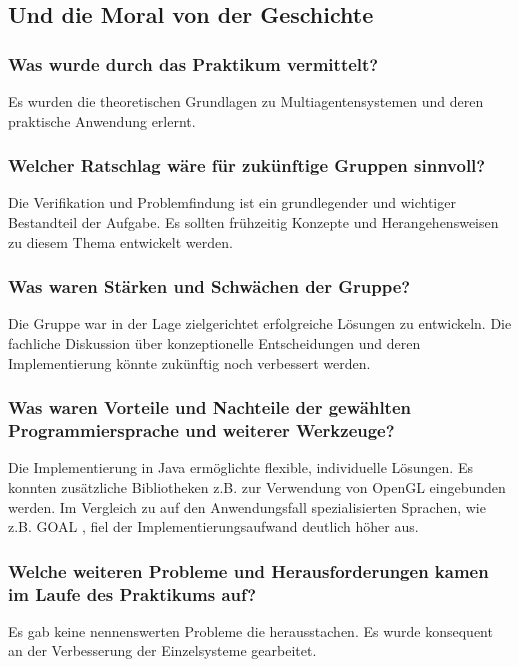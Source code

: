 \documentclass[runningheads]{llncs}
\begin{document}
	\subsection{Und die Moral von der Geschichte}
	\subsubsection{Was wurde durch das Praktikum vermittelt?\\}
	Es wurden die theoretischen Grundlagen zu Multiagentensystemen und deren praktische Anwendung erlernt.
	\subsubsection{Welcher Ratschlag wäre für zukünftige Gruppen sinnvoll?\\}
	Die Verifikation und Problemfindung ist ein grundlegender und wichtiger Bestandteil der Aufgabe. Es sollten frühzeitig Konzepte und Herangehensweisen zu diesem Thema entwickelt werden.
	
	\subsubsection{Was waren Stärken und Schwächen der Gruppe?\\}
	Die Gruppe war in der Lage zielgerichtet erfolgreiche Lösungen zu entwickeln. Die fachliche Diskussion über konzeptionelle Entscheidungen und deren Implementierung könnte zukünftig noch verbessert werden.   
	
	\subsubsection{Was waren Vorteile und Nachteile der gewählten Programmiersprache und weiterer Werkzeuge?\\}
	Die Implementierung in Java ermöglichte flexible, individuelle Lösungen. Es konnten zusätzliche Bibliotheken z.B. zur Verwendung von OpenGL eingebunden werden. Im Vergleich zu auf den Anwendungsfall spezialisierten Sprachen, wie z.B. GOAL \cite{Goal}, fiel der Implementierungsaufwand deutlich höher aus.
	
	\subsubsection{Welche weiteren Probleme und Herausforderungen kamen im Laufe des Praktikums auf?\\}
	Es gab keine nennenswerten Probleme die herausstachen. Es wurde konsequent an der Verbesserung der Einzelsysteme gearbeitet. 
\end{document}
